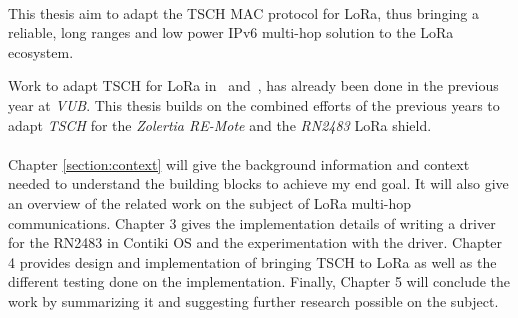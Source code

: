 \paragraph{}

This thesis aim to adapt the TSCH MAC protocol for LoRa,
thus bringing a reliable, long ranges and low power IPv6 multi-hop
solution to the LoRa ecosystem.

Work to adapt TSCH for LoRa in~\cite{8847137} and~\cite{njomgang_2018}, has
already been done in the previous year at \emph{VUB}.
This thesis builds on the combined efforts of the previous
years to adapt \emph{TSCH} for the \emph{Zolertia RE-Mote} and the
\emph{RN2483} LoRa shield.

\paragraph{}

Chapter \ref{section:context} will give the background information and context needed to
understand the building blocks to achieve my end goal.
It will also give an overview of the related work on the subject of
LoRa multi-hop communications.
Chapter 3 gives the implementation details of writing a driver for the
RN2483 in Contiki OS and the experimentation with the driver.
Chapter 4 provides design and implementation of bringing TSCH to LoRa as well as
the different testing done on the implementation.
Finally, Chapter 5 will conclude the work by summarizing it and suggesting
further research possible on the subject.
